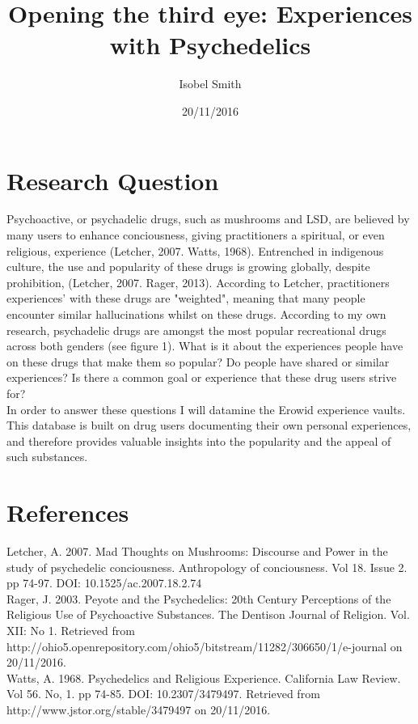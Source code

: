 \documentclass{article}
\title{Opening the third eye: Experiences with Psychedelics}
\author{Isobel Smith}
\date{20/11/2016}
\begin{document}
\maketitle

\section{Research Question}

Psychoactive, or psychadelic drugs, such as mushrooms and LSD, are believed by many users to enhance conciousness, giving practitioners a spiritual, or even religious, experience (Letcher, 2007. Watts, 1968). Entrenched in indigenous culture, the use and popularity of these drugs is growing globally, despite prohibition, (Letcher, 2007. Rager, 2013). According to Letcher, practitioners experiences' with these drugs are "weighted", meaning that many people encounter similar hallucinations whilst on these drugs.  According to my own research, psychadelic drugs are amongst the most popular recreational drugs across both genders (see figure 1). What is it about the experiences people have on these drugs that make them so popular? Do people have shared or similar experiences? Is there a common goal or experience that these drug users strive for?\\

In order to answer these questions I will datamine the Erowid experience vaults. This database is built on drug users documenting their own personal experiences, and therefore provides valuable insights into the popularity and the appeal of such substances. 

\section{References}
Letcher, A. 2007. Mad Thoughts on Mushrooms: Discourse and Power in the study of psychedelic conciousness. Anthropology of conciousness. Vol 18. Issue 2. pp 74-97. DOI: 10.1525/ac.2007.18.2.74\\

Rager, J. 2003. Peyote and the Psychedelics: 20th Century Perceptions of the Religious Use of Psychoactive Substances. The Dentison Journal of Religion. Vol. XII: No 1. Retrieved from http://ohio5.openrepository.com/ohio5/bitstream/11282/306650/1/e-journal on 20/11/2016.\\

Watts, A. 1968. Psychedelics and Religious Experience. California Law Review. Vol 56. No, 1. pp 74-85. DOI: 10.2307/3479497. Retrieved from http://www.jstor.org/stable/3479497 on 20/11/2016.
\end{document}
